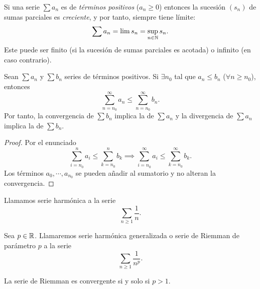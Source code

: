 \begin{prop}
    Si una serie $\sum a_n$ es de \textit{términos positivos} ($a_n \geq 0$) entonces la
    sucesión $(s_n)$ de sumas parciales es \textit{creciente}, y por tanto, siempre tiene
    límite:
    \[
        \sum a_n = \lim s_n = \sup_{n \in \mathbb{N}} s_n.
    \]
    Este puede ser finito (si la sucesión de sumas parciales es acotada) o infinito (en caso
    contrario).
\end{prop}

\begin{prop}
    Sean $\sum a_n$ y $\sum b_n$ series de términos positivos. Si $\exists n_0$ tal que
    $a_n \leq b_n$ ($\forall n \geq n_0$), entonces
    \[
        \sum_{n=n_0}^{\infty} a_n \leq \sum_{n=n_0}^{\infty} b_n.
    \]
    Por tanto, la convergencia de $\sum b_n$ implica la de $\sum a_n$ y la divergencia de
    $\sum a_n$ implica la de $\sum b_n$.
\end{prop}

\begin{proof}
    Por el enunciado
    \[
        \sum_{i=n_0}^{n} a_i \leq \sum_{k=n_0}^{n} b_k \implies
        \sum_{i=n_0}^{\infty} a_i \leq \sum_{k=n_0}^{\infty} b_k.
    \]
    Los términos $a_0, \cdots, a_{n_0}$ se pueden añadir al sumatorio y no alteran
    la convergencia.
\end{proof}

\begin{defi}
    Llamamos serie harmónica a la serie
    \[
        \sum_{n \geq 1} \frac{1}{n}.
    \]
\end{defi}

\begin{defi}
    Sea $p \in \mathbb{R}$. Llamaremos serie harmónica generalizada o serie de Riemman
    de parámetro $p$ a la serie
    \[
        \sum_{n \geq 1} \frac{1}{n^p}.
    \]
\end{defi}

\begin{prop}
    La serie de Riemman es convergente si y solo si $p > 1$.
\end{prop}

